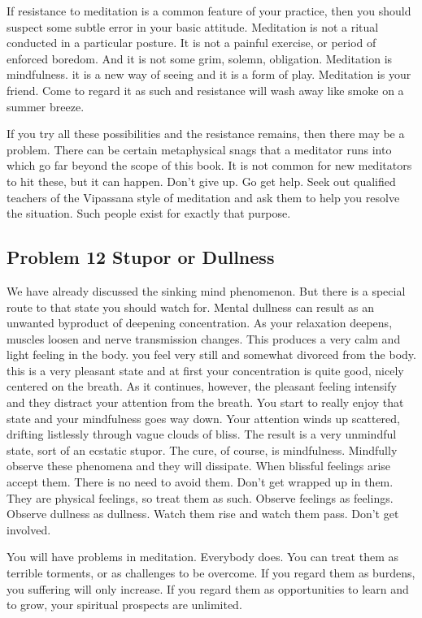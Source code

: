 If resistance to meditation is a common feature of your practice, then you
should suspect some subtle error in your basic attitude.
Meditation is not a ritual conducted in a particular posture. It is not a painful exercise, or period of enforced boredom. And it is
not some grim, solemn, obligation. Meditation is mindfulness. it is a new way of seeing and it is a form of play. Meditation is
your friend. Come to regard it as such and resistance will wash away like smoke on a summer breeze.

If you try all these possibilities and the resistance remains, then there may be
a problem. There can be certain metaphysical snags that a meditator runs into
which go far beyond the scope of this book. It is not common for new meditators
to hit these, but it can happen. Don't give up. Go get help. Seek out qualified
teachers of the Vipassana style of meditation and ask them to help you resolve
the situation. Such people exist for exactly that purpose.

\subsection*{Problem 12 Stupor or Dullness}
We have already discussed the sinking mind
phenomenon. But there is a special route to that state you should watch for.
Mental dullness can result as an unwanted byproduct of deepening concentration.
As your relaxation deepens, muscles loosen and nerve transmission changes. This
produces a very calm and light feeling in the body. you feel very still and
somewhat divorced from the body. this is a very pleasant state and at first your
concentration is quite good, nicely centered on the breath. As it continues,
however, the pleasant feeling intensify and they distract your attention from
the breath. You start to really enjoy that state and your mindfulness goes way
down. Your attention winds up scattered, drifting listlessly through vague
clouds of bliss. The result is a very unmindful state, sort of an ecstatic
stupor. The cure, of course, is mindfulness. Mindfully observe these phenomena
and they will dissipate. When blissful feelings arise accept them. There is no
need to avoid them. Don't get wrapped up in them. They are physical feelings, so
treat them as such. Observe feelings as feelings. Observe dullness as dullness.
Watch them rise and watch them pass. Don't get involved.

You will have problems in meditation. Everybody does. You can treat them as
terrible torments, or as challenges to be overcome.  If you regard them as
burdens, you suffering will only increase. If you regard them as opportunities
to learn and to grow, your spiritual prospects are unlimited.
